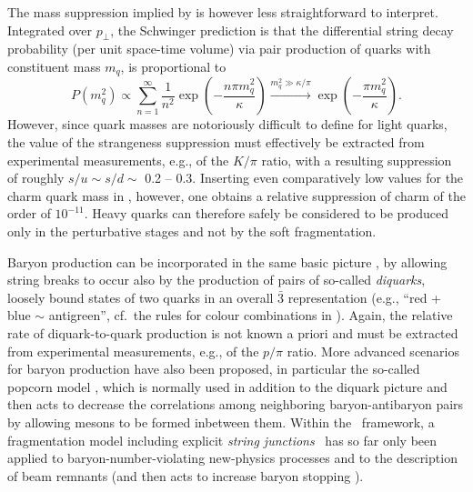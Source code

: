 %
%
The mass suppression implied by  is however less 
straightforward to interpret. Integrated over $p_\perp$, the Schwinger prediction is that the differential string decay probability (per unit space-time volume) via pair production of quarks with constituent mass $m_q$,  is proportional to   
\begin{equation}
P(m_q^2) \propto \sum_{n=1}^\infty \frac{1}{n^2} \exp\left( -\frac{n \pi m_q^2}{\kappa} \right)\stackrel{m_q^2\gg \kappa/\pi}{\to} \exp\left( -\frac{\pi m_q^2}{\kappa} \right).
\end{equation}
However, since quark masses
are notoriously difficult to define for light quarks, the value of the
strangeness suppression must effectively be extracted from experimental
measurements, e.g., of the $K/\pi$ ratio, with a
resulting suppression of roughly $s/u \sim s/d \sim$ 0.2 -- 0.3.
Inserting even comparatively low values for the charm quark mass in
, however, one obtains a relative suppression of
charm of the order of $10^{-11}$. Heavy quarks can therefore safely be
considered to be produced only in the perturbative stages 
and not by the soft fragmentation.

%
%
Baryon production can be incorporated in the same basic picture
\cite{Andersson:1981ce},  
by  allowing  string breaks to occur also by the production of
pairs of so-called \emph{diquarks}, 
loosely bound states of two quarks in an overall $\bar{3}$
representation (e.g., ``red + blue $\sim$ antigreen'', cf.~the
rules for colour combinations in ). Again,
the relative  
rate of diquark-to-quark production is not known a priori and must be
extracted from experimental measurements, e.g., of the $p/\pi$ ratio. 
More advanced
scenarios for baryon production have also been proposed, in particular
the so-called popcorn model \cite{Andersson:1984af,Eden:1996xi}, which
is normally used in addition 
to the diquark picture and then acts to decrease the correlations
among neighboring baryon-antibaryon pairs by allowing mesons to be formed
inbetween them. 
%
%
Within the \Py\ framework, 
a fragmentation model including explicit \emph{string
  junctions}~\cite{Sjostrand:2002ip} has so far only been applied to
baryon-number-violating new-physics processes  and to the 
description of beam remnants (and then acts to increase baryon
stopping  \cite{Sjostrand:2004pf}). 

